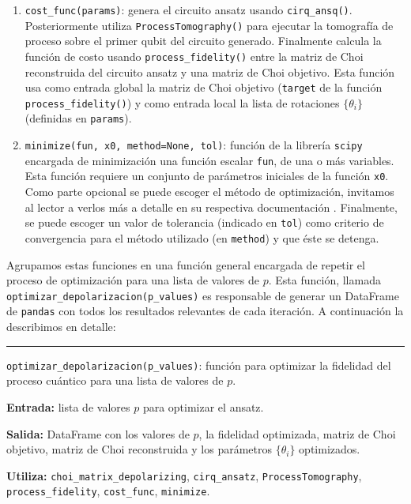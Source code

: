 \documentclass[letterpaper,12pt]{thesisECFM}
\theoremstyle{plain}
\theoremstyle{definition}
\theoremstyle{remark}
\newcommand{\1}{\mathbb{1}}
\begin{document}
\begin{enumerate}
    \item \texttt{cost\_func(params)}: genera el circuito ansatz usando \texttt{cirq\_ansq()}. Posteriormente utiliza \texttt{ProcessTomography()} para ejecutar la tomografía de proceso sobre el primer qubit del circuito generado. Finalmente calcula la función de costo usando \texttt{process\_fidelity()} entre la matriz de Choi reconstruida del circuito ansatz y una matriz de Choi objetivo. Esta función usa como entrada global la matriz de Choi objetivo (\texttt{target} de la función \texttt{process\_fidelity()}) y como entrada local la lista de rotaciones $\{\theta_i\}$ (definidas en  \texttt{params}).

    \item \texttt{minimize(fun, x0, method=None, tol)}: función de la librería \texttt{scipy} encargada de minimización una función escalar \texttt{fun}, de una o más variables. Esta función requiere un conjunto de parámetros iniciales de la función \texttt{x0}. Como parte opcional se puede escoger el método de optimización, invitamos al lector a verlos más a detalle en su respectiva documentación \cite{scipy}. Finalmente, se puede escoger un valor de tolerancia (indicado en \texttt{tol})  como criterio de convergencia para el método  utilizado (en \texttt{method}) y que éste se detenga.
    
\end{enumerate}

Agrupamos estas funciones en una función general encargada de repetir el proceso de optimización para una lista de valores de $p$. Esta función, llamada \texttt{optimizar\_depolarizacion(p\_values)} es responsable de generar un DataFrame de \texttt{pandas} con todos los resultados relevantes de cada iteración. A continuación la describimos en detalle:

\noindent\rule{\textwidth}{1mm}
\texttt{optimizar\_depolarizacion(p\_values)}: función para optimizar la fidelidad del proceso cuántico para una lista de valores de $p$. \newline

\noindent\textbf{Entrada:} lista de valores $p$ para optimizar el ansatz.

\noindent\textbf{Salida:} DataFrame con los valores de $p$, la fidelidad optimizada, matriz de Choi objetivo, matriz de Choi reconstruida y los parámetros $\{\theta_i\}$ optimizados.

\noindent\textbf{Utiliza:} \texttt{choi\_matrix\_depolarizing}, \texttt{cirq\_ansatz}, \texttt{ProcessTomography}, \texttt{process\_fidelity}, \texttt{cost\_func}, \texttt{minimize}. \newline
\end{document}
